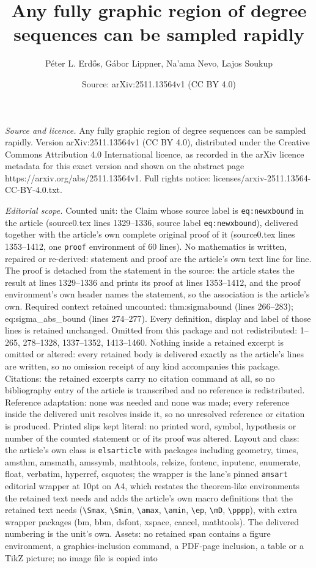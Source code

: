 \documentclass[10pt,a4paper]{amsart}
\title[Any fully graphic region of degree sequences can be sampled ]{Any fully graphic region of degree sequences can be sampled rapidly}
\author{P\'eter L. Erd\H{o}s, G\'abor Lippner, Na'ama Nevo, Lajos Soukup}
\date{Source: arXiv:2511.13564v1 (CC BY 4.0)}
\begin{document}
\maketitle

\noindent\emph{Source and licence.} Any fully graphic region of degree sequences can be sampled rapidly. Version arXiv:2511.13564v1 (CC BY 4.0), distributed under the Creative Commons Attribution 4.0 International licence, as recorded in the arXiv licence metadata for this exact version and shown on the abstract page https://arxiv.org/abs/2511.13564v1. Full rights notice: licenses/arxiv-2511.13564-CC-BY-4.0.txt.\par\smallskip

\noindent\textit{Editorial scope.} Counted unit: the Claim whose source label is \texttt{eq:newxbound} in the article (source0.tex lines 1329--1336, source label \texttt{eq:newxbound}), delivered together with the article's own complete original proof of it (source0.tex lines 1353--1412, one \texttt{proof} environment of 60 lines). No mathematics is written, repaired or re-derived: statement and proof are the article's own text line for line. The proof is detached from the statement in the source: the article states the result at lines 1329--1336 and prints its proof at lines 1353--1412, and the proof environment's own header names the statement, so the association is the article's own. Required context retained uncounted: thm:sigmabound (lines 266--283); eq:sigma\_abs\_bound (lines 274--277). Every definition, display and label of those lines is retained unchanged. Omitted from this package and not redistributed: 1--265, 278--1328, 1337--1352, 1413--1460. Nothing inside a retained excerpt is omitted or altered: every retained body is delivered exactly as the article's lines are written, so no omission receipt of any kind accompanies this package. Citations: the retained excerpts carry no citation command at all, so no bibliography entry of the article is transcribed and no reference is redistributed. Reference adaptation: none was needed and none was made; every reference inside the delivered unit resolves inside it, so no unresolved reference or citation is produced. Printed slips kept literal: no printed word, symbol, hypothesis or number of the counted statement or of its proof was altered. Layout and class: the article's own class is \texttt{elsarticle} with packages including geometry, times, amsthm, amsmath, amssymb, mathtools, relsize, fontenc, inputenc, enumerate, float, verbatim, hyperref, csquotes; the wrapper is the lane's pinned \texttt{amsart} editorial wrapper at 10pt on A4, which restates the theorem-like environments the retained text needs and adds the article's own macro definitions that the retained text needs (\texttt{\textbackslash Smax}, \texttt{\textbackslash Smin}, \texttt{\textbackslash amax}, \texttt{\textbackslash amin}, \texttt{\textbackslash ep}, \texttt{\textbackslash mD}, \texttt{\textbackslash pppp}), with extra wrapper packages (bm, bbm, dsfont, xspace, cancel, mathtools). The delivered numbering is the unit's own. Assets: no retained span contains a figure environment, a graphics-inclusion command, a PDF-page inclusion, a table or a TikZ picture; no image file is copied into 
\end{document}
